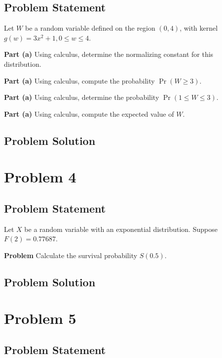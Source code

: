 \documentclass[12pt]{article}
\theoremstyle{definition}
\begin{document}
\subsection*{Problem Statement}

Let $W$ be a random variable defined on the region $(0,4)$, with kernel $g(w) = 3x^2 + 1, 0 \leq w \leq 4$.

\bigskip
\noindent
{\bf Part (a)} Using calculus, determine the normalizing constant for this distribution.

\bigskip
\noindent
{\bf Part (a)} Using calculus, compute the probability $\Pr(W \geq 3)$.

\bigskip
\noindent
{\bf Part (a)} Using calculus, determine the probability $\Pr(1 \leq W \leq 3)$.

\bigskip
\noindent
{\bf Part (a)} Using calculus, compute the expected value of $W$.




\subsection*{Problem Solution}




\newpage
\section*{Problem 4}

\subsection*{Problem Statement}

Let $X$ be a random variable with an exponential distribution. Suppose $F(2) = 0.77687$.

\bigskip
\noindent
{\bf Problem} Calculate the survival probability $S(0.5)$.


\subsection*{Problem Solution}




\newpage
\section*{Problem 5}

\subsection*{Problem Statement}
\end{document}
